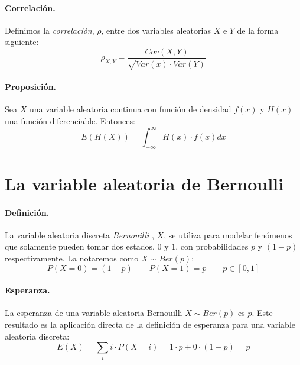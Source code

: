 \paragraph{Correlaci\'on.} Definimos la \emph{correlaci\'on},
$\rho$, entre dos variables aleatorias $X$ e $Y$ de la forma siguiente:
\begin{displaymath}
\rho_{X,Y} = \frac{Cov(X,Y)}{\sqrt{Var(x) \cdot Var(Y)}}
\end{displaymath}

\paragraph{Proposici\'on.} Sea $X$ una variable aleatoria continua con
funci\'on de densidad $f(x)$ y $H(x)$ una funci\'on diferenciable. Entonces:
\begin{displaymath}
E(H(X)) = \int_{-\infty}^{\infty} H(x) \cdot f(x) dx
\end{displaymath}



\section{La variable aleatoria de Bernoulli}

\paragraph{Definici\'on.} La variable aleatoria discreta \emph{Bernouilli}
, $X$, se utiliza para modelar fen\'omenos que solamente pueden
tomar dos estados, $0$ y $1$, con probabilidades $p$ y $(1-p)$ respectivamente.
La notaremos como $X \sim Ber(p)$:
\begin{displaymath}
P(X=0) = (1 - p) \qquad   P(X=1) = p \qquad p \in [0,1]
\end{displaymath}
 
\paragraph{Esperanza.} La esperanza de una variable aleatoria Bernouilli $X \sim Ber(p)$ 
es $p$. Este resultado es la aplicaci\'on directa de la definici\'on de esperanza 
para una variable aleatoria discreta:
\begin{displaymath}
E(X) = \sum_{i} i \cdot P(X=i) = 1 \cdot p + 0 \cdot (1-p) = p
\end{displaymath}

